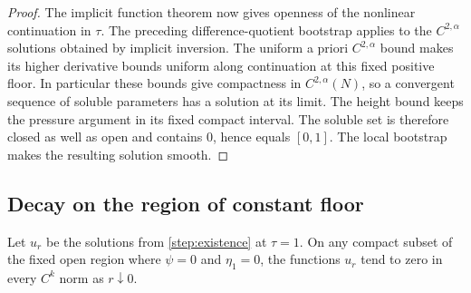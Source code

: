 \begin{proof}
The implicit function theorem now gives openness of the nonlinear
continuation in $\tau$.  The preceding difference-quotient bootstrap
applies to the $C^{2,\alpha}$ solutions obtained by implicit inversion.
The uniform a priori $C^{2,\alpha}$ bound makes its higher derivative
bounds uniform along continuation at this fixed positive floor.
In particular these bounds give compactness in
$C^{2,\alpha}(N)$, so a convergent sequence of soluble parameters
has a solution at its limit.  The height bound keeps the pressure
argument in its fixed compact interval.  The soluble set is therefore
closed as well as open and contains $0$, hence equals $[0,1]$.
The local bootstrap makes the resulting solution smooth.
\end{proof}

\subsection{Decay on the region of constant floor}

\begin{lemma}[Locality]\label{step:locality}
Let $u_r$ be the solutions from \cref{step:existence} at $\tau=1$.
On any compact subset of the fixed open region where $\psi=0$ and
$\eta_1=0$, the functions $u_r$ tend to zero in every $C^k$ norm as
$r\downarrow0$.
\end{lemma}

